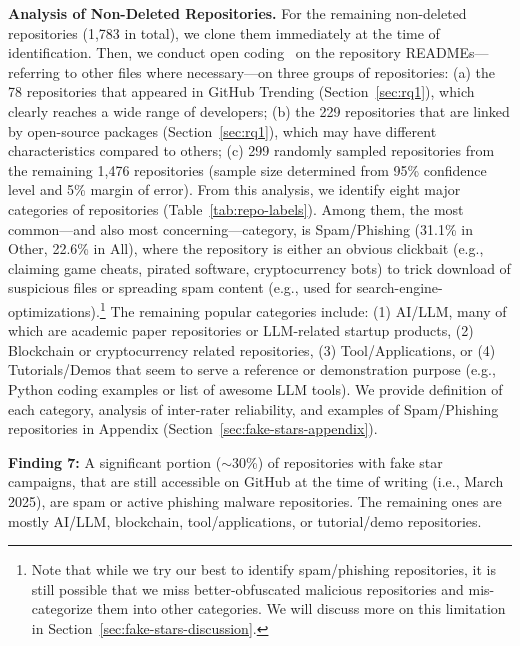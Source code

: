 \textbf{Analysis of Non-Deleted Repositories.}
For the remaining non-deleted repositories (1,783 in total), we clone them immediately at the time of identification. 
Then, we conduct open coding~\cite{khandkar2009open} on the repository READMEs---referring to other files where necessary---on three groups of repositories:
(a) the 78 repositories that appeared in GitHub Trending (Section~\ref{sec:rq1}), which clearly reaches a wide range of developers;
(b) the 229 repositories that are linked by open-source packages (Section~\ref{sec:rq1}), which may have different characteristics compared to others;
(c) 299 randomly sampled repositories from the remaining 1,476 repositories (sample size determined from 95\% confidence level and 5\% margin of error).
From this analysis, we identify eight major categories of repositories (Table~\ref{tab:repo-labels}).
Among them, the most common---and also most concerning---category, is \textsf{Spam/Phishing} (31.1\% in Other, 22.6\% in All), where the repository is either an obvious clickbait (e.g., claiming game cheats, pirated software, cryptocurrency bots) to trick download of suspicious files or spreading spam content (e.g.,  used for search-engine-optimizations).\footnote{Note that while we try our best to identify spam/phishing repositories, it is still possible that we miss better-obfuscated malicious repositories and mis-categorize them into other categories.
We will discuss more on this limitation in Section~\ref{sec:fake-stars-discussion}.}
The remaining popular categories include: (1) \textsf{AI/LLM}, many of which are academic paper repositories or LLM-related startup products, (2) \textsf{Blockchain} or cryptocurrency related repositories, (3) \textsf{Tool/Applications}, or (4) \textsf{Tutorials/Demos} that seem to serve a reference or demonstration purpose (e.g., Python coding examples or list of awesome LLM tools).
We provide definition of each category, analysis of inter-rater reliability, and examples of \textsf{Spam/Phishing} repositories in Appendix (Section~\ref{sec:fake-stars-appendix}).

\begin{summary-rq}
\textbf{Finding 7:} 
A significant portion ($\sim$30\%) of repositories with fake star campaigns, that are still accessible on GitHub at the time of writing (i.e., March 2025), are spam or active phishing malware repositories. 
The remaining ones are mostly AI/LLM, blockchain, tool/applications, or tutorial/demo repositories.
\end{summary-rq}

